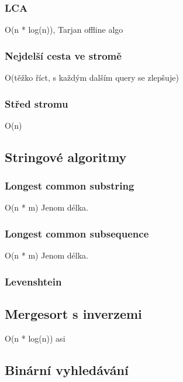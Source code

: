 \documentclass[10pt, a4paper]{article}
\begin{document}
\subsubsection{LCA}
O(n * log(n)), Tarjan offline algo


\subsubsection{Nejdelší cesta ve stromě}
O(těžko říct, s každým dalším query se zlepšuje)


\subsubsection{Střed stromu}
O(n)



\subsection{Stringové algoritmy}
\subsubsection{Longest common substring}
O(n * m)
Jenom délka.


\subsubsection{Longest common subsequence}
O(n * m)
Jenom délka.


\subsubsection{Levenshtein}


\subsection{Mergesort s inverzemi}
O(n * log(n)) asi


\subsection{Binární vyhledávání}

\end{document}
